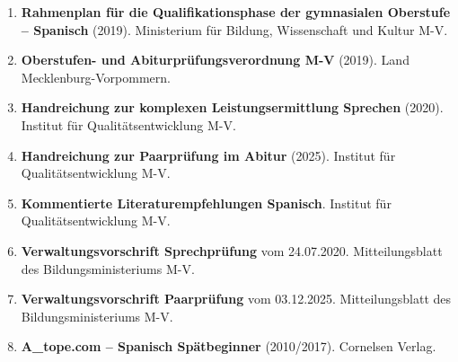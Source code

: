 \documentclass[10pt,a4paper]{article}
\begin{document}
\begin{enumerate}[noitemsep]
\item \textbf{Rahmenplan für die Qualifikationsphase der gymnasialen Oberstufe -- Spanisch} (2019). Ministerium für Bildung, Wissenschaft und Kultur M-V.
\item \textbf{Oberstufen- und Abiturprüfungsverordnung M-V} (2019). Land Mecklenburg-Vorpommern.
\item \textbf{Handreichung zur komplexen Leistungsermittlung Sprechen} (2020). Institut für Qualitätsentwicklung M-V.
\item \textbf{Handreichung zur Paarprüfung im Abitur} (2025). Institut für Qualitätsentwicklung M-V.
\item \textbf{Kommentierte Literaturempfehlungen Spanisch}. Institut für Qualitätsentwicklung M-V.
\item \textbf{Verwaltungsvorschrift Sprechprüfung} vom 24.07.2020. Mitteilungsblatt des Bildungsministeriums M-V.
\item \textbf{Verwaltungsvorschrift Paarprüfung} vom 03.12.2025. Mitteilungsblatt des Bildungsministeriums M-V.
\item \textbf{A\_tope.com -- Spanisch Spätbeginner} (2010/2017). Cornelsen Verlag.
\end{enumerate}

\vspace{1cm}

\begin{center}
\end{center}
\end{document}
